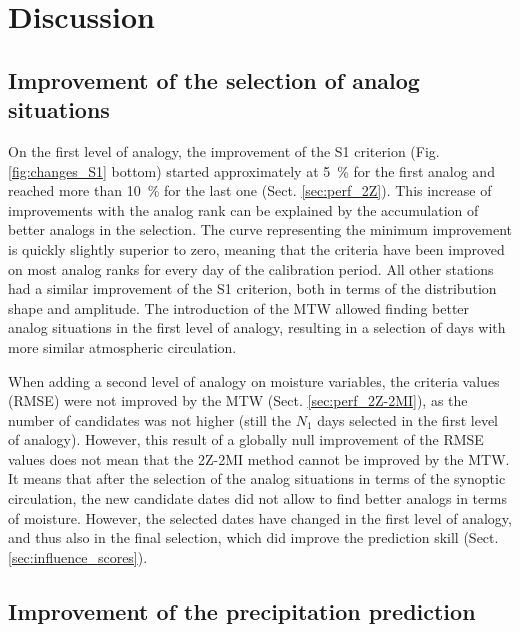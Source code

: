 \documentclass[hess, manuscript]{copernicus}
\begin{document}
\section{Discussion}
\label{sec:discussion}


\subsection{Improvement of the selection of analog situations}

On the first level of analogy, the improvement of the S1 criterion (Fig. \ref{fig:changes_S1} bottom) started approximately at 5~\% for the first analog and reached more than 10~\% for the last one (Sect. \ref{sec:perf_2Z}). This increase of improvements with the analog rank can be explained by the accumulation of better analogs in the selection. The curve representing the minimum improvement is quickly slightly superior to zero, meaning that the criteria have been improved on most analog ranks for every day of the calibration period. All other stations had a similar improvement of the S1 criterion, both in terms of the distribution shape and amplitude. The introduction of the MTW allowed finding better analog situations in the first level of analogy, resulting in a selection of days with more similar atmospheric circulation.

When adding a second level of analogy on moisture variables, the criteria values (RMSE) were not improved by the MTW (Sect. \ref{sec:perf_2Z-2MI}), as the number of candidates was not higher (still the $N_{1}$ days selected in the first level of analogy). However, this result of a globally null improvement of the RMSE values does not mean that the 2Z-2MI method cannot be improved by the MTW. It means that after the selection of the analog situations in terms of the synoptic circulation, the new candidate dates did not allow to find better analogs in terms of moisture. However, the selected dates have changed in the first level of analogy, and thus also in the final selection, which did improve the prediction skill (Sect. \ref{sec:influence_scores}).


\subsection{Improvement of the precipitation prediction}
\end{document}
